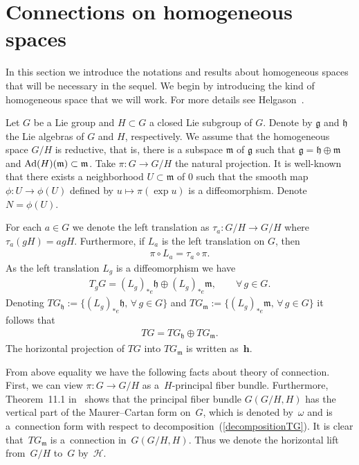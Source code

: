 \documentclass[10pt,a4paper]{amsart}
\numberwithin{equation}{section}
\newcommand{\m}{\mathfrak{m}}
\begin{document}
\section{Connections on homogeneous spaces}\label{section2}

In this section we introduce the notations and results about
homogeneous spaces that will be necessary in the sequel. We begin by
introducing the kind of homogeneous space that we will work. For
more details see Helgason~\cite{Helgason}.

Let $G$ be a Lie group and $H\subset G$ a closed Lie subgroup of $G$. Denote by $\mathfrak{g}$ and $\mathfrak{h}$ the Lie algebras of $G$ and $H$, respectively. We assume that the homogeneous space $G/H$ is reductive, that is, there is a subspace $\mathfrak{m}$ of $\mathfrak{g}$ such that $\mathfrak{g} = \mathfrak{h} \oplus \mathfrak{m}$ and ${\rm Ad}(H)(\m)\subset \m$. Take $\pi \colon G \rightarrow G/H$ the natural projection. It is well-known that there exists a neighborhood $U \subset \m$ of $0$ such that the smooth map $\phi\colon U \rightarrow \phi(U)$ def\/ined by $u \mapsto \pi(\exp u)$ is a dif\/feomorphism. Denote $N = \phi (U)$.

For each $a \in G$ we denote the left translation as $\tau_{a}\colon G/H \rightarrow G/H$ where $\tau_{a}(gH) = agH$.  Furthermore, if $L_{a}$ is the left translation on $G$, then
\begin{gather*}
  \pi \circ L_{a} = \tau_{a} \circ \pi.
\end{gather*}
As the left translation $L_{g}$ is a dif\/feomorphism we have
\begin{gather*}
  T_{g}G = (L_{g})_{*e}\mathfrak{h} \oplus (L_{g})_{*e}\mathfrak{m}, \qquad \forall\,  g \in G.
\end{gather*}
Denoting $TG_{\mathfrak{h}}:= \{ (L_{g})_{*e}\mathfrak{h}, \, \forall\, g \in G \}$ and $TG_{\mathfrak{m}}:= \{ (L_{g})_{*e}\mathfrak{m},\,\forall\, g \in G \}$ it follows that
\begin{gather}\label{decompositionTG}
  TG = TG_{\mathfrak{h}} \oplus TG_{\mathfrak{m}}.
\end{gather}
The horizontal projection of $TG$ into $TG_{\mathfrak{m}}$ is written as~$\mathbf{h}$.

From above equality we have the following facts about theory of
connection. First, we can view $\pi\colon G \rightarrow G/H$ as a~$H$-principal f\/iber bundle. Furthermore, Theorem~11.1 in~\cite{KobayashiS/NomizuK} shows that the principal f\/iber bundle
$G(G/H,H)$ has the vertical part of the Maurer--Cartan form on~$G$,
which is denoted by~$\omega$ and is a~connection form with respect
to decomposition~(\ref{decompositionTG}). It is clear that~$TG_{\m}$
is a~connection in~$G(G/H,H)$. Thus we denote the horizontal lift
from~$G/H$ to~$G$ by~$\mathcal{H}$.
\end{document}

